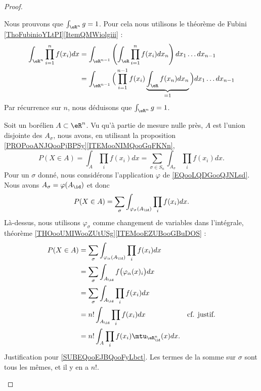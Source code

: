 \begin{proof}
\begin{subproof}
		\spitem[Intégrale \( 1\)]
		Nous prouvons que \( \int_{\eR^n}g=1\). Pour cela nous utilisons le théorème de Fubini \ref{ThoFubinioYLtPI}\ref{ItemQMWiolgiii} :
		\begin{subequations}
			\begin{align}
				\int_{\eR^n}\prod_{i=1}^nf(x_i)dx & =\int_{\eR^{n-1}}\left(   \int_{\eR}\prod_{i=1}^nf(x_i)dx_n  \right)dx_1\ldots dx_{n-1}                         \\
				                                  & =\int_{\eR^{n-1}}\Big(  \prod_{i=1}^{n-1}f(x_i)\underbrace{\int_{\eR}f(x_n)dx_n}_{=1}  \Big)dx_1\ldots dx_{n-1}
			\end{align}
		\end{subequations}
		Par récurrence sur \( n\), nous déduisons que \( \int_{\eR^n}g=1\).

		\spitem[\( P(X\in A)\)]

		Soit un borélien \( A\subset \eR^n\). Vu qu'à partie de mesure nulle près, \( A\) est l'union disjointe des \( A_{\sigma}\), nous avons, en utilisant la proposition \ref{PROPooANJQooPjBPSy}\ref{ITEMooNIMQooGqFKNn},
		\begin{equation}
			P(X\in A)=\int_A\prod_if(x_i)dx=\sum_{\sigma\in S_n}\int_{A_{\sigma}}\prod_if(x_i)dx.
		\end{equation}
		Pour un \( \sigma\) donné, nous considérons l'application \( \varphi\) de \eqref{EQooLQDGooQJNLsd}. Nous avons \( A_{\sigma}=\varphi(A_{\id})\) et donc
		\begin{equation}
			P(X\in A)=\sum_{\sigma}\int_{\varphi_{\sigma}(A_{\id})}\prod_if(x_i)dx.
		\end{equation}
		Là-dessus, nous utilisons \( \varphi_{\sigma}\) comme changement de variables dans l'intégrale, théorème \ref{THOooUMIWooZUtUSg}\ref{ITEMooEZUBooGBuDOS} :
		\begin{subequations}
			\begin{align}
				P(X\in A) & =\sum_{\sigma}\int_{\varphi_{\alpha}(A_{\id})}\prod_if(x_i)dx                                                     \\
				          & =\sum_{\sigma}\int_{A_{\id}}f\big( \varphi_{\alpha}(x)_i \big)dx                                                  \\
				          & =\sum_{\sigma}\int_{A_{\id}}\prod_if(x_i)dx                                                                       \\
				          & =n!\int_{A_{\id}}\prod_if(x_i)dx                                 & \text{cf. justif.} \label{SUBEQooEJBQooFyLbct} \\
				          & =n!\int_A\prod_if(x_i)\mtu_{\eR^n_{\id}}(x)dx.
			\end{align}
		\end{subequations}
		Justification pour \eqref{SUBEQooEJBQooFyLbct}. Les termes de la somme sur \( \sigma\) sont tous les mêmes, et il y en a \( n!\).
	\end{subproof}
\end{proof}


